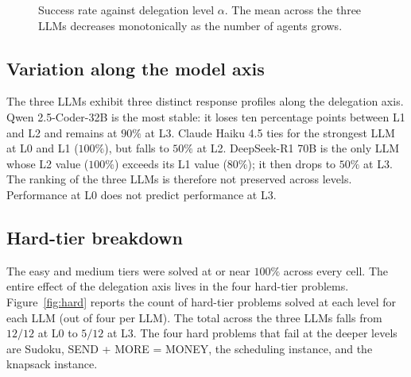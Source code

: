 \documentclass[11pt,a4paper]{article}
\begin{document}
\begin{figure}[H]
\centering
{}
\caption{Success rate against delegation level $\alpha$. The mean across the three LLMs decreases monotonically as the number of agents grows.}
\label{fig:success-curve}
\end{figure}

\subsection{Variation along the model axis}\label{sec:results:models}
The three LLMs exhibit three distinct response profiles along the delegation axis. Qwen 2.5-Coder-32B is the most stable: it loses ten percentage points between L1 and L2 and remains at $90\%$ at L3. Claude Haiku 4.5 ties for the strongest LLM at L0 and L1 ($100\%$), but falls to $50\%$ at L2. DeepSeek-R1 70B is the only LLM whose L2 value ($100\%$) exceeds its L1 value ($80\%$); it then drops to $50\%$ at L3. The ranking of the three LLMs is therefore not preserved across levels. Performance at L0 does not predict performance at L3.

\subsection{Hard-tier breakdown}\label{sec:results:hard}
The easy and medium tiers were solved at or near $100\%$ across every cell. The entire effect of the delegation axis lives in the four hard-tier problems. Figure~\ref{fig:hard} reports the count of hard-tier problems solved at each level for each LLM (out of four per LLM). The total across the three LLMs falls from $12/12$ at L0 to $5/12$ at L3. The four hard problems that fail at the deeper levels are Sudoku, SEND + MORE = MONEY, the scheduling instance, and the knapsack instance.
\end{document}
